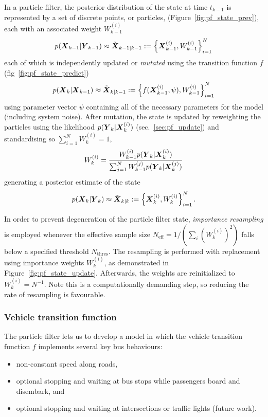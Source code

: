 In a particle filter, the posterior distribution of the state at time $t_{k-1}$
is represented by a set of discrete points, or particles, (Figure~\ref{fig:pf_state_prev}),
each with an associated weight $W_{k-1}^{(i)}$
\begin{equation}
p(\mbox{$\boldsymbol{X}$}_{k-1} | \mbox{$\boldsymbol{Y}$}_{k-1}) \approx \tilde{\mbox{$\boldsymbol{X}$}}_{k-1|k-1} 
:= \left\{\mbox{$\boldsymbol{X}$}_{k-1}^{(i)}, W_{k-1}^{(i)}\right\}_{i=1}^N
\end{equation}
each of which is independently updated or \emph{mutated} using the transition function $f$ (fig~\ref{fig:pf_state_predict})
\begin{equation}
p(\mbox{$\boldsymbol{X}$}_k | \mbox{$\boldsymbol{X}$}_{k-1}) \approx \tilde{\mbox{$\boldsymbol{X}$}}_{k|k-1} := 
\left\{f(\mbox{$\boldsymbol{X}$}_{k-1}^{(i)}, \psi), W_{k-1}^{(i)}\right\}_{i=1}^N
\end{equation}
using parameter vector $\psi$ containing all of the necessary parameters
for the model (including system noise).
After mutation, 
the state is updated by reweighting the particles using the likelihood $p(\mbox{$\boldsymbol{Y}$}_k | \mbox{$\boldsymbol{X}$}_k^{(i)})$ 
(sec.~\ref{sec:pf_update}) and standardising so $\sum_{i=1}^N W_k^{(i)} = 1$,
\begin{equation*}
W_k^{(i)} = \frac{W_{k-1}^{(i)} p(\mbox{$\boldsymbol{Y}$}_k | \mbox{$\boldsymbol{X}$}_k^{(i)})}{
    \sum_{j=1}^N W_{k-1}^{(j)} p(\mbox{$\boldsymbol{Y}$}_k | \mbox{$\boldsymbol{X}$}_k^{(j)})
}
\end{equation*}
generating a posterior estimate of the state
\begin{equation}
p(\mbox{$\boldsymbol{X}$}_k | \mbox{$\boldsymbol{Y}$}_k) \approx \tilde{\mbox{$\boldsymbol{X}$}}_{k|k} := 
\left\{\mbox{$\boldsymbol{X}$}_{k}^{(i)}, W_{k}^{(i)}\right\}_{i=1}^N.
\end{equation}

In order to prevent degeneration of the particle filter state,
\emph{importance resampling} is employed whenever the 
effective sample size $N_{\text{eff}} = 1/(\sum_i (W_k^{(i)})^2)$
falls below a specified threshold $N_{\text{thres}}$.
The resampling is performed with replacement using importance weights $W_k^{(i)}$,
as demonstrated in Figure~\ref{fig:pf_state_update}.
Afterwards, the weights are reinitialized to $W_k^{(i)} = N^{-1}$.
Note this is a computationally demanding step,
so reducing the rate of resampling is favourable.



\subsubsection{Vehicle transition function}
\label{sec:pf_prediction}

The particle filter lets us to develop a model in which
the vehicle transition function $f$ implements several key bus behaviours:
\begin{itemize}
\item non-constant speed along roads,
\item optional stopping and waiting at bus stops while passengers board and disembark, and
\item optional stopping and waiting at intersections or traffic lights (future work).
\end{itemize}

